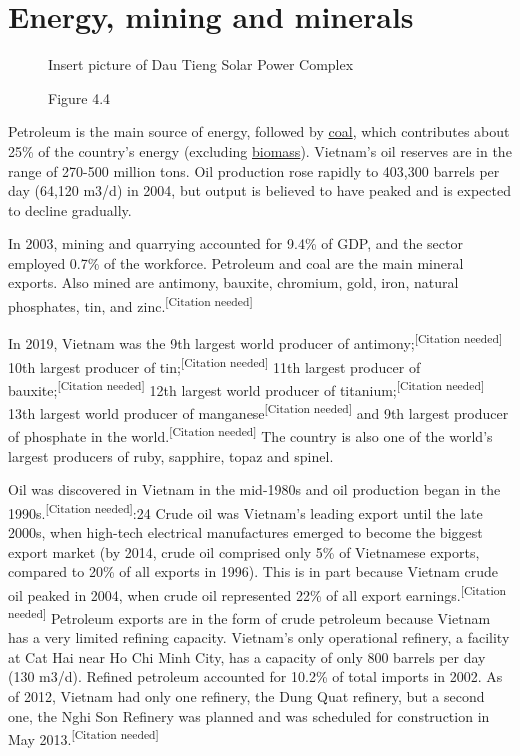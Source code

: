 \documentclass[openany]{book}
\begin{document}
\section{Energy, mining and minerals}

\begin{figure}
    \begin{framed}
    Insert picture of Dau Tieng Solar Power Complex
    \caption*{\href{https://en.wikipedia.org/wiki/Dau_Tieng_Solar_Power_Project}{Dau Tieng Solar Power Complex} is the largest solar farm in \href{https://en.wikipedia.org/wiki/Southeast_Asia}{Southeast Asia}.}
    \caption*{Figure 4.4}
    \end{framed}
\end{figure}

Petroleum is the main source of energy, followed by \href{https://en.wikipedia.org/wiki/Coal}{coal}, which contributes about 25\% of the country's energy (excluding \href{https://en.wikipedia.org/wiki/Biomass}{biomass}). Vietnam's oil reserves are in the range of 270-500 million tons. Oil production rose rapidly to 403,300 barrels per day (64,120 m3/d) in 2004, but output is believed to have peaked and is expected to decline gradually.

In 2003, mining and quarrying accounted for 9.4\% of GDP, and the sector employed 0.7\% of the workforce. Petroleum and coal are the main mineral exports. Also mined are antimony, bauxite, chromium, gold, iron, natural phosphates, tin, and zinc.\textsuperscript{[Citation needed]}

In 2019, Vietnam was the 9th largest world producer of antimony;\textsuperscript{[Citation needed]} 10th largest producer of tin;\textsuperscript{[Citation needed]} 11th largest producer of \\bauxite;\textsuperscript{[Citation needed]} 12th largest world producer of titanium;\textsuperscript{[Citation needed]} 13th largest world producer of manganese\textsuperscript{[Citation needed]} and 9th largest producer of phosphate in the world.\textsuperscript{[Citation needed]} The country is also one of the world's largest producers of ruby, sapphire, topaz and spinel.

Oil was discovered in Vietnam in the mid-1980s and oil production began in the 1990s.\textsuperscript{[Citation needed]}:24 Crude oil was Vietnam's leading export until the late 2000s, when high-tech electrical manufactures emerged to become the biggest export market (by 2014, crude oil comprised only 5\% of Vietnamese exports, compared to 20\% of all exports in 1996). This is in part because Vietnam crude oil peaked in 2004, when crude oil represented 22\% of all export earnings.\textsuperscript{[Citation needed]} Petroleum exports are in the form of crude petroleum because Vietnam has a very limited refining capacity. Vietnam's only operational refinery, a facility at Cat Hai near Ho Chi Minh City, has a capacity of only 800 barrels per day (130 m3/d). Refined petroleum accounted for 10.2\% of total imports in 2002. As of 2012, Vietnam had only one refinery, the Dung Quat refinery, but a second one, the Nghi Son Refinery was planned and was scheduled for construction in May 2013.\textsuperscript{[Citation needed]}
\end{document}
